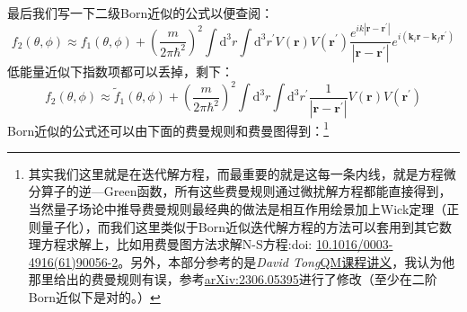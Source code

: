 \documentclass[a4paper,zihao=-4,linespread=1]{ctexrep}
\newcommand{\DOI}[1]{doi: \href{https://doi.org/#1}{#1}} %
\begin{document}
	最后我们写一下二级Born近似的公式以便查阅：
	\begin{equation}
		f_2(\theta,\phi)\approx f_1(\theta,\phi)+\left(\frac{m}{2\pi\hbar^2}\right)^2\int\mathrm{d}^3r\int\mathrm{d}^3r^\prime V(\mathbf{r})V(\mathbf{r^\prime})\frac{e^{ik|\mathbf{r}-\mathbf{r^\prime}|}}{|\mathbf{r}-\mathbf{r^\prime}|}e^{i\left(\mathbf{k}_i\mathbf{r}-\mathbf{k}_f\mathbf{r^\prime}\right)}
	\end{equation}
	低能量近似下指数项都可以丢掉，剩下：
	\begin{equation}
		f_2(\theta,\phi)\approx \tilde{f}_1(\theta,\phi)+\left(\frac{m}{2\pi\hbar^2}\right)^2\int\mathrm{d}^3r\int\mathrm{d}^3r^\prime \frac{1}{|\mathbf{r}-\mathbf{r^\prime}|}V(\mathbf{r})V(\mathbf{r^\prime})
	\end{equation}
	Born近似的公式还可以由下面的费曼规则和费曼图得到：\footnote{其实我们这里就是在迭代解方程，而最重要的就是这每一条内线，就是方程微分算子的逆—Green函数，所有这些费曼规则通过微扰解方程都能直接得到，当然量子场论中推导费曼规则最经典的做法是相互作用绘景加上Wick定理（正则量子化），而我们这里类似于Born近似迭代解方程的方法可以套用到其它数理方程求解上，比如用费曼图方法求解N-S方程:\DOI{10.1016/0003-4916(61)90056-2}。另外，本部分参考的是{\itshape David Tong}\href{http://www.damtp.cam.ac.uk/user/tong/topicsinqm.html}{QM\uppercase\expandafter{}课程讲义}，我认为他那里给出的费曼规则有误，参考\href{https://arxiv.org/abs/2306.05395}{arXiv:2306.05395}进行了修改（至少在二阶Born近似下是对的。）}
\end{document}

